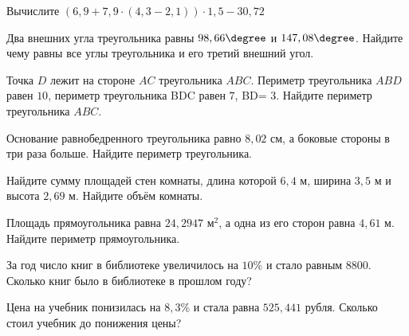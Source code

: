\begin{exam}
	\begin{listofex}
		\item Вычислите  \( (6,9+7,9\cdot(4,3-2,1))\cdot1,5-30,72 \) 
		\item Два внешних угла треугольника равны \( 98,66\degree \) и \( 147,08\degree \). Найдите чему равны все углы треугольника и его третий внешний угол.
		\item Точка \( D \) лежит на стороне \( AC \) треугольника \( ABC \). Периметр треугольника \( ABD \) равен \( 10 \), периметр треугольника BDC равен \( 7 \), BD= \( 3 \). Найдите периметр треугольника \( ABC \).
		\item  Основание равнобедренного треугольника равно \( 8,02 \) см, а боковые стороны в три раза больше. Найдите периметр треугольника.
		\item Найдите сумму площадей стен комнаты, длина которой \( 6,4 \) м, ширина \( 3,5 \) м и высота \( 2,69 \) м. Найдите объём комнаты.
		\item Площадь прямоугольника равна \( 24,2947 \) м\( ^{2} \), а одна из его сторон равна \( 4,61 \) м. Найдите периметр прямоугольника.
		\item За год число книг в библиотеке увеличилось на \( 10\% \) и стало равным \( 8800 \). Сколько книг
		было в библиотеке в прошлом году?
		\item Цена на учебник понизилась на \( 8,3\% \) и стала равна \( 525,441  \) рубля. Сколько стоил учебник до понижения цены?
	\end{listofex}
\end{exam}
